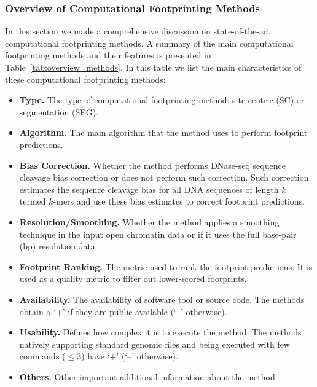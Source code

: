 \subsubsection{Overview of Computational Footprinting Methods}

In this section we made a comprehensive discussion on state-of-the-art computational footprinting methods. A summary of the main computational footprinting methods and their features is presented in Table~\ref{tab:overview_methods}. In this table we list the main characteristics of these computational footprinting methods:

\begin{itemize}
\item \textbf{Type.} The type of computational footprinting method: site-centric (SC) or segmentation (SEG).
\item \textbf{Algorithm.} The main algorithm that the method uses to perform footprint predictions.
\item \textbf{Bias Correction.} Whether the method performs DNase-seq sequence cleavage bias correction or does not perform such correction. Such correction estimates the sequence cleavage bias for all DNA sequences of length $k$ termed $k$-mers and use these bias estimates to correct footprint predictions.
\item \textbf{Resolution/Smoothing.} Whether the method applies a smoothing technique in the input open chromatin data or if it uses the full base-pair (bp) resolution data.
\item \textbf{Footprint Ranking.} The metric used to rank the footprint predictions. It is used as a quality metric to filter out lower-scored footprints.
\item \textbf{Availability.} The availability of software tool or source code. The methods obtain a `+' if they are public available (`--' otherwise).
\item \textbf{Usability.} Defines how complex it is to execute the method. The methods natively supporting standard genomic files and being executed with few commands ($\leq3$) have `+' (`--' otherwise).
\item \textbf{Others.} Other important additional information about the method.
\end{itemize}

